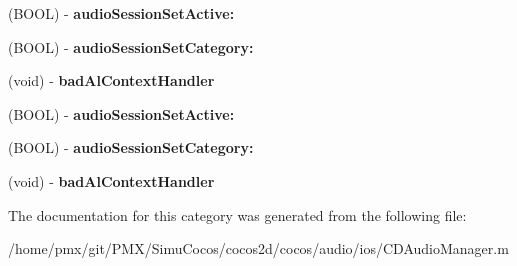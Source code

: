 \begin{DoxyCompactItemize}
(B\+O\+OL) -\/ {\bfseries audio\+Session\+Set\+Active\+:}
\item 
\mbox{\label{categoryCDAudioManager_07PrivateMethods_08_a6f3477c3ea17cb909c974d915aa537ff}} 
(B\+O\+OL) -\/ {\bfseries audio\+Session\+Set\+Category\+:}
\item 
\mbox{\label{categoryCDAudioManager_07PrivateMethods_08_a95773df277cf1440a70017986eba5357}} 
(void) -\/ {\bfseries bad\+Al\+Context\+Handler}
\item 
\mbox{\label{categoryCDAudioManager_07PrivateMethods_08_a4b56e335717210211452776f410fe663}} 
(B\+O\+OL) -\/ {\bfseries audio\+Session\+Set\+Active\+:}
\item 
\mbox{\label{categoryCDAudioManager_07PrivateMethods_08_a6f3477c3ea17cb909c974d915aa537ff}} 
(B\+O\+OL) -\/ {\bfseries audio\+Session\+Set\+Category\+:}
\item 
\mbox{\label{categoryCDAudioManager_07PrivateMethods_08_a95773df277cf1440a70017986eba5357}} 
(void) -\/ {\bfseries bad\+Al\+Context\+Handler}
\end{DoxyCompactItemize}


The documentation for this category was generated from the following file\+:\begin{DoxyCompactItemize}
\item 
/home/pmx/git/\+P\+M\+X/\+Simu\+Cocos/cocos2d/cocos/audio/ios/C\+D\+Audio\+Manager.\+m\end{DoxyCompactItemize}
